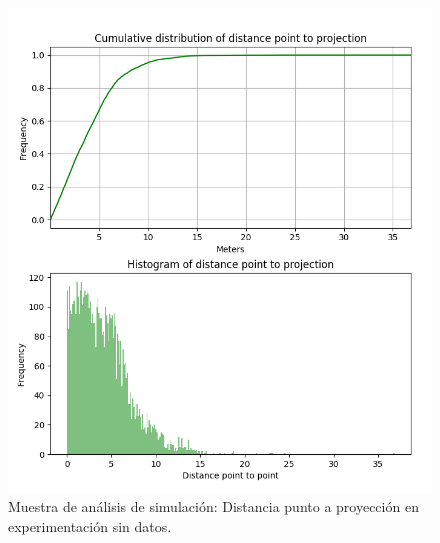 \begin{figure}[!htb]
\begin{minipage}{0.48\textwidth}
\centering
\includegraphics[width=1.2\textwidth]{./Imagenes/SimulateCumulativePointProjectionEmpty.png}
\caption{Muestra de análisis de simulación: Distancia punto a proyección en experimentación sin datos.}
\label{figure:SimulatedPointToProjectionEmpty}
\end{minipage}\hfill
\begin{minipage}{0.48\textwidth}
\centering

\end{minipage}
\end{figure}
